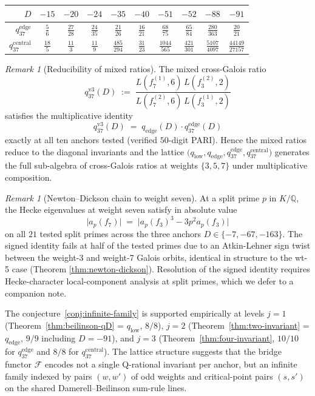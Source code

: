 \documentclass[11pt]{amsart}
\theoremstyle{definition}
\theoremstyle{remark}
\newtheorem{remark}[theorem]{Remark}
\newcommand{\Q}{\mathbb{Q}}
\begin{document}
\begin{center}
\begin{tabular}{rccccccccc}
\toprule
$D$ & $-15$ & $-20$ & $-24$ & $-35$ & $-40$ & $-51$ & $-52$ & $-88$ & $-91$\\
\midrule
$q_{37}^{\mathrm{edge}}$
  & $\frac{5}{6}$ & $\frac{27}{28}$ & $\frac{24}{35}$ & $\frac{21}{26}$ & $\frac{16}{21}$ & $\frac{68}{75}$ & $\frac{65}{84}$ & $\frac{280}{363}$ & $\frac{20}{21}$\\[2pt]
$q_{37}^{\mathrm{central}}$
  & $\frac{18}{5}$ & $\frac{11}{3}$ & $\frac{11}{9}$ & $\frac{485}{294}$ & $\frac{31}{23}$ & $\frac{1044}{565}$ & $\frac{421}{301}$ & $\frac{5107}{4097}$ & $\frac{44149}{27157}$\\
\bottomrule
\end{tabular}
\end{center}

\begin{remark}[Reducibility of mixed ratios]
\label{rk:mixed-reducible}
The mixed cross-Galois ratio
\[
q_{37}^{\mathrm{v3}}(D) \;:=\;
\frac{L(f_7^{(1)}, 6)\,L(f_3^{(2)}, 2)}{L(f_7^{(2)}, 6)\,L(f_3^{(1)}, 2)}
\]
satisfies the multiplicative identity
\[
q_{37}^{\mathrm{v3}}(D) \;=\; q_{\mathrm{edge}}(D) \cdot q_{37}^{\mathrm{edge}}(D)
\]
exactly at all ten anchors tested (verified $50$-digit PARI). Hence
the mixed ratios reduce to the diagonal invariants and the lattice
$\bigl(q_{\mathrm{low}}, q_{\mathrm{edge}}, q_{37}^{\mathrm{edge}},
q_{37}^{\mathrm{central}}\bigr)$ generates the full sub-algebra
of cross-Galois ratios at weights $\{3, 5, 7\}$ under
multiplicative composition.
\end{remark}

\begin{remark}[Newton--Dickson chain to weight seven]
\label{rk:newton-wt7}
At a split prime $p$ in $K/\Q$, the Hecke eigenvalues at weight
seven satisfy in absolute value
\[
\bigl|a_p(f_7)\bigr| \;=\; \bigl|a_p(f_3)^3 - 3 p^2 a_p(f_3)\bigr|
\]
on all $21$ tested split primes across the three anchors
$D \in \{-7, -67, -163\}$. The signed identity fails at half of
the tested primes due to an Atkin-Lehner sign twist between the
weight-3 and weight-7 Galois orbits, identical in structure to
the wt-5 case (Theorem \ref{thm:newton-dickson}). Resolution of
the signed identity requires Hecke-character local-component
analysis at split primes, which we defer to a companion note.
\end{remark}

The conjecture~\ref{conj:infinite-family} is supported empirically
at levels $j = 1$ (Theorem~\ref{thm:beilinson-qD} = $q_{\mathrm{low}}$,
$8/8$), $j = 2$ (Theorem~\ref{thm:two-invariant} =
$q_{\mathrm{edge}}$, $9/9$ including $D = -91$), and $j = 3$
(Theorem~\ref{thm:four-invariant}, $10/10$ for $q_{37}^{\mathrm{edge}}$
and $8/8$ for $q_{37}^{\mathrm{central}}$). The lattice structure
suggests that the bridge functor $\mathcal{F}$ encodes not a single
Q-rational invariant per anchor, but an infinite family indexed by
pairs $(w, w')$ of odd weights and critical-point pairs $(s, s')$
on the shared Damerell--Beilinson sum-rule lines.
\end{document}
